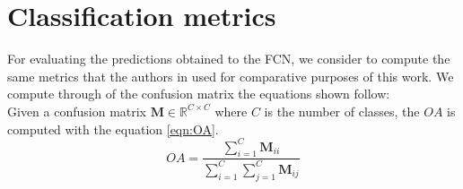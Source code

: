 \documentclass[journal,article,submit,pdftex,moreauthors]{Definitions/mdpi}
\begin{document}




\section[\appendixname~\thesection]{Classification metrics}\label{distance_m} 
For evaluating the predictions obtained to the FCN, we consider to compute the same metrics that the authors in \cite{Russwurm2020} used for comparative purposes of this work. We compute through of the confusion matrix the equations shown follow:\\

Given a confusion matrix $\mathbf{M} \in \mathbb{R}^{C \times C}$ where $C$ is the number of classes, the $OA$ is computed with the equation \ref{eqn:OA}.
\begin{equation}
	\label{eqn:OA}
	OA = \frac{\sum_{i=1}^{C} \mathbf{M}_{ii}}{\sum_{i=1}^{C} \sum_{j=1}^{C} \mathbf{M}_{ij}}
\end{equation}
\end{document}

